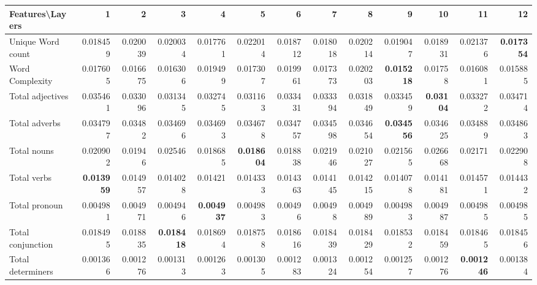 \documentclass[sigconf]{acmart}
\begin{document}
\begin{table*}[]
\begin{adjustbox}{width=1\textwidth}
\begin{tabular}{@{}l|rrrrrrrrrrrr@{}}
\toprule
\textbf{Features\textbackslash{}Layers} & 1 & 2 & 3 & 4 & 5 & 6 & 7 & 8 & 9 & 10 & 11 & 12 \\ \midrule
Unique Word count & 0.018459 & 0.020039 & 0.020034 & 0.017761 & 0.022014 & 0.018712 & 0.018018 & 0.020214 & 0.019047 & 0.018931 & 0.021376 & \textbf{0.017354} \\
Word Complexity & 0.017605 & 0.016675 & 0.016306 & 0.019499 & 0.017307 & 0.019961 & 0.017373 & 0.020203 & \textbf{0.015218} & 0.01758 & 0.016081 & 0.015885\\ 
Total adjectives                        & 0.035461          & 0.033096          & 0.031345          & 0.032745          & 0.031163          & 0.033431 & 0.033394 & 0.031849 & 0.033459          & \textbf{0.03104} & 0.033272          & 0.034714 \\
Total adverbs                           & 0.034797          & 0.03482           & 0.034696          & 0.034693          & 0.034678          & 0.034757 & 0.034598 & 0.034654 & \textbf{0.034556} & 0.034625         & 0.034889          & 0.034863 \\
Total nouns                             & 0.020902          & 0.01946           & 0.02546           & 0.018685          & \textbf{0.018604} & 0.018838 & 0.021946 & 0.021027 & 0.021565          & 0.026668         & 0.02171           & 0.022908 \\
Total verbs                             & \textbf{0.013959} & 0.014957          & 0.014028          & 0.01421           & 0.014333          & 0.014363 & 0.014145 & 0.014215 & 0.014078          & 0.014181         & 0.014571          & 0.014432 \\
Total pronoun                           & 0.004981          & 0.004971          & 0.004946          & \textbf{0.004937} & 0.004983          & 0.00496  & 0.00498  & 0.004989 & 0.004983          & 0.004987         & 0.004985          & 0.004985 \\
Total conjunction                       & 0.018495          & 0.018835          & \textbf{0.018418} & 0.018694          & 0.018758          & 0.018616 & 0.018439 & 0.018429 & 0.018532          & 0.018459         & 0.018465          & 0.018456 \\
Total determiners                       & 0.001366          & 0.001276          & 0.001313          & 0.001263          & 0.001305          & 0.001283 & 0.001324 & 0.001254 & 0.001257          & 0.001276         & \textbf{0.001246} & 0.001384 \\

\end{tabular}
\end{adjustbox}
\end{table*}
\end{document}
